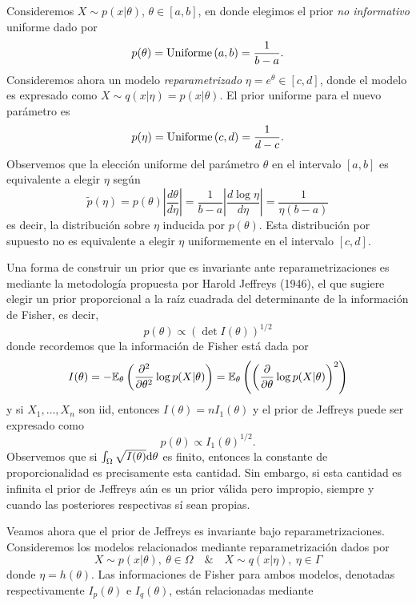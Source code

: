 Consideremos $X\sim p(x|\theta)$, $\theta\in [a,b]$, en donde elegimos el prior \textit{no informativo} uniforme dado por 
\begin{equation}
	p(\theta) =\text{Uniforme}\left(a,b\right) = \frac{1}{b-a}.
\end{equation}
Consideremos ahora un modelo \textit{reparametrizado} $\eta = e^\theta\in[c,d]$, donde el modelo es expresado como $X\sim q(x|\eta) = p(x|\theta) $. El prior uniforme para el nuevo parámetro es
\begin{equation}
	p(\eta) =\text{Uniforme}\left(c,d\right) = \frac{1}{d-c}.
\end{equation}
Observemos que la elección uniforme del parámetro $\theta$ en el intervalo $[a,b]$ es equivalente a elegir $\eta$ según
\begin{equation}
	\tilde{p}(\eta) = p(\theta) \left|\frac{d\theta}{d\eta}\right| = \frac{1}{b-a}\left|\frac{d\log\eta}{d\eta}\right|= \frac{1}{\eta (b-a)}
\end{equation}
es decir, la distribución sobre $\eta$ inducida por $p(\theta)$. Esta distribución por supuesto no es equivalente a elegir $\eta$ uniformemente en el intervalo $[c,d]$. 

Una forma de construir un prior que es invariante ante reparametrizaciones es mediante la metodología propuesta por  Harold Jeffreys (1946), el que sugiere elegir un prior proporcional a la raíz cuadrada del determinante de la información de Fisher, es decir,  
\begin{equation}
	p(\theta) \propto \left( \det I(\theta)\right)^{1/2}
\end{equation}
donde recordemos que la información de Fisher está dada por 
\begin{equation}
	I(\theta) = -\mathbb{E}_\theta \left(\frac{\partial^2}{\partial\theta^2}\log p(X|\theta)\right) = \mathbb{E}_\theta \left(\left(\frac{\partial}{\partial\theta}\log p(X|\theta)\right)^2\right)
\end{equation}
y si $X_1,\ldots,X_n$ son iid, entonces $I(\theta) = n I_1(\theta)$ y el prior de Jeffreys puede ser expresado como 
\begin{equation}
	p(\theta) \propto  I_1(\theta)^{1/2}.
\end{equation}
Observemos que si $\int_\Omega\sqrt{I(\theta)}{\text{d}}\theta$ es finito, entonces la constante de proporcionalidad es precisamente esta cantidad. Sin embargo, si esta cantidad es infinita el prior de Jeffreys aún es un prior válida pero impropio, siempre y cuando las posteriores respectivas sí sean propias. 

Veamos ahora que el prior de Jeffreys es invariante bajo reparametrizaciones. Consideremos los modelos relacionados mediante reparametrización dados por 
\begin{equation}
	X\sim p(x|\theta),\ \theta\in\Omega\quad \& \quad X\sim q(x|\eta),\ \eta\in\Gamma
\end{equation}
donde $\eta = h(\theta)$. Las informaciones de Fisher para ambos modelos, denotadas respectivamente $I_p(\theta)$ e $I_q(\theta)$, están relacionadas mediante

